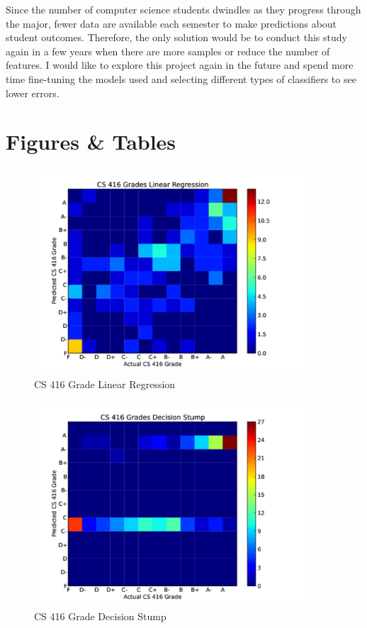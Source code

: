 \documentclass[letterpaper,11pt]{article}
\begin{document}
Since the number of computer science students dwindles as they progress through the major, fewer data are available each semester to make predictions about student outcomes.  Therefore, the only solution would be to conduct this study again in a few years when there are more samples or reduce the number of features.  I would like to explore this project again in the future and spend more time fine-tuning the models used and selecting different types of classifiers to see lower errors.

\section{Figures \& Tables}

\begin{figure}[h!]
\includegraphics[width=4in]{416grade_lin.pdf}
  \caption {CS 416 Grade Linear Regression}
\label{figure:heatmaps1}
\end{figure}

\begin{figure}[h!]
\includegraphics[width=4in]{416grade_des.pdf}
  \caption {CS 416 Grade Decision Stump}
\label{figure:heatmaps2}
\end{figure}
\end{document}
